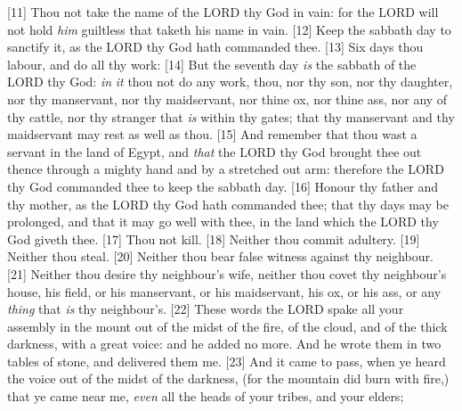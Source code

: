 [11] \textcolor[cmyk]{0.99998,1,0,0}{Thou   not take the name of the LORD thy God in vain: for the LORD will not hold \emph{him} guiltless that taketh his name in vain.}
[12] \textcolor[cmyk]{0.99998,1,0,0}{Keep the sabbath day to sanctify it, as the LORD thy God hath commanded thee.}
[13] \textcolor[cmyk]{0.99998,1,0,0}{Six days thou   labour, and do all thy work:}
[14] \textcolor[cmyk]{0.99998,1,0,0}{But the seventh day \emph{is} the sabbath of the LORD thy God: \emph{in} \emph{it} thou   not do any work, thou, nor thy son, nor thy daughter, nor thy manservant, nor thy maidservant, nor thine ox, nor thine ass, nor any of thy cattle, nor thy stranger that \emph{is} within thy gates; that thy manservant and thy maidservant may rest as well as thou.}
[15] \textcolor[cmyk]{0.99998,1,0,0}{And remember that thou wast a servant in the land of Egypt, and \emph{that} the LORD thy God brought thee out thence through a mighty hand and by a stretched out arm: therefore the LORD thy God commanded thee to keep the sabbath day.}
[16] \textcolor[cmyk]{0.99998,1,0,0}{Honour thy father and thy mother, as the LORD thy God hath commanded thee; that thy days may be prolonged, and that it may go well with thee, in the land which the LORD thy God giveth thee.}
[17] \textcolor[cmyk]{0.99998,1,0,0}{Thou   not kill.}
[18] \textcolor[cmyk]{0.99998,1,0,0}{Neither   thou commit adultery.}
[19] \textcolor[cmyk]{0.99998,1,0,0}{Neither   thou steal.}
[20] \textcolor[cmyk]{0.99998,1,0,0}{Neither   thou bear false witness against thy neighbour.}
[21] \textcolor[cmyk]{0.99998,1,0,0}{Neither   thou desire thy neighbour's wife, neither   thou covet thy neighbour's house, his field, or his manservant, or his maidservant, his ox, or his ass, or any \emph{thing} that \emph{is} thy neighbour's.}
[22] \textcolor[cmyk]{0.99998,1,0,0}{These words the LORD spake   all your assembly in the mount   {out of the midst of the fire}, of the cloud, and of the thick darkness, with a great voice: and he added no more. And he wrote them in two tables of stone, and delivered them   me.}
[23] \textcolor[cmyk]{0.99998,1,0,0}{And it came to pass, when ye heard the voice out of the midst of the darkness, (for the mountain did burn with fire,) that ye came near   me, \emph{even} all the heads of your tribes, and your elders;}
